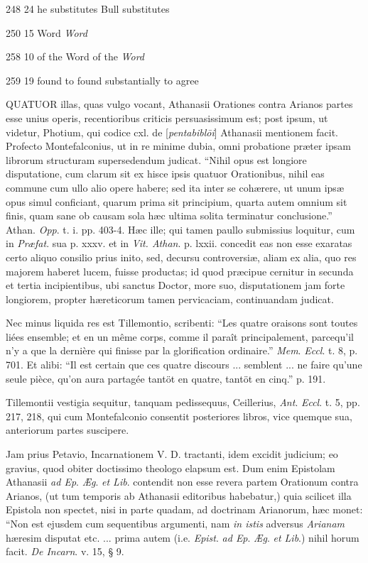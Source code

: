 248
24
he substitutes
Bull substitutes


250
15
Word
\emph{Word}


258
10
of the Word
of the \emph{Word}


259
19
found to
found substantially to agree



QUATUOR illas, quas vulgo
vocant, Athanasii Orationes contra Arianos partes esse unius operis,
recentioribus criticis persuasissimum est; post ipsum, ut videtur,
Photium, qui codice cxl. de [\emph{pentabibl\={o}i}] Athanasii
mentionem facit. Profecto Montefalconius, ut in re minime dubia, omni
probatione præter ipsam librorum structuram supersedendum judicat. ``Nihil
opus est longiore disputatione, cum clarum sit ex hisce ipsis quatuor
Orationibus, nihil eas commune cum ullo alio opere habere; sed ita
inter se cohærere, ut unum ipsæ opus simul conficiant, quarum prima
sit principium, quarta autem omnium sit finis, quam sane ob causam
sola hæc ultima solita terminatur conclusione.'' Athan. \emph{Opp}. t.
i. pp. 403-4. Hæc ille; qui tamen paullo submissius loquitur, cum in \emph{Præfat}. sua p. xxxv. et in \emph{Vit. Athan}. p. lxxii. concedit
eas non esse exaratas certo aliquo consilio prius inito, sed, decursu
controversiæ, aliam ex alia, quo res majorem haberet lucem, fuisse
productas; id quod præcipue cernitur in secunda et tertia
incipientibus, ubi sanctus Doctor, more suo, disputationem jam forte
longiorem, propter hæreticorum tamen pervicaciam, continuandam
judicat.

Nec
minus liquida res est Tillemontio, scribenti: ``Les quatre oraisons
sont toutes liées ensemble; et en un même corps, comme il paraît
principalement, parcequ'il n'y a que la dernière qui finisse par la
glorification ordinaire.'' \emph{Mem}. \emph{Eccl}. t. 8, p. 701. Et
alibi: ``Il est certain que ces quatre discours ... semblent ... ne
faire qu'une seule pièce, qu'on aura partagée tantöt en quatre,
tantöt en cinq.'' p. 191.

Tillemontii
vestigia sequitur, tanquam pedissequus, Ceillerius, \emph{Ant}. \emph{Eccl}.
t. 5, pp. 217, 218, qui cum Montefalconio consentit posteriores libros,
vice quemque sua, anteriorum partes suscipere.

Jam prius Petavio,
Incarnationem V. D. tractanti, idem excidit judicium; eo gravius, quod
obiter doctissimo theologo elapsum est. Dum enim Epistolam Athanasii \emph{ad
Ep}. \emph{Æg}. \emph{et Lib}. contendit non esse revera partem
Orationum contra Arianos, (ut tum temporis ab Athanasii editoribus
habebatur,) quia scilicet illa Epistola non spectet, nisi in parte
quadam, ad doctrinam Arianorum, hæc monet: ``Non est ejusdem cum
sequentibus argumenti, nam \emph{in istis} adversus \emph{Arianam} hæresim
disputat etc. ... prima autem (i.e. \emph{Epist}. \emph{ad Ep}. \emph{Æg}.
\emph{et Lib}.) nihil horum facit. \emph{De Incarn}. v. 15, § 9.

